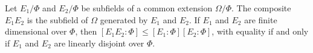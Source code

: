 Let $E_1/\Phi$ and $E_2/\Phi$ be subfields of a common extension $\Omega/\Phi$. The composite $E_1 E_2$ is the subfield of $\Omega$ generated by $E_1$ and $E_2$. If $E_1$ and $E_2$ are finite dimensional over $\Phi$, then $[E_1 E_2 : \Phi] \leq [E_1 : \Phi][E_2 : \Phi]$, with equality if and only if $E_1$ and $E_2$ are linearly disjoint over $\Phi$.
